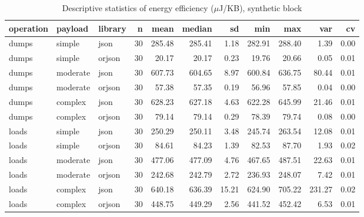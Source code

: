 \begin{table}[ht]
\centering
\begin{tabular}{lllrrrrrrrr}
  \toprule
operation & payload & library & n & mean & median & sd & min & max & var & cv \\ 
  \midrule
dumps & simple & json &  30 & 285.48 & 285.41 & 1.18 & 282.91 & 288.40 & 1.39 & 0.00 \\ 
  dumps & simple & orjson &  30 & 20.17 & 20.17 & 0.23 & 19.76 & 20.66 & 0.05 & 0.01 \\ 
  dumps & moderate & json &  30 & 607.73 & 604.65 & 8.97 & 600.84 & 636.75 & 80.44 & 0.01 \\ 
  dumps & moderate & orjson &  30 & 57.38 & 57.35 & 0.19 & 56.96 & 57.85 & 0.04 & 0.00 \\ 
  dumps & complex & json &  30 & 628.23 & 627.18 & 4.63 & 622.28 & 645.99 & 21.46 & 0.01 \\ 
  dumps & complex & orjson &  30 & 79.14 & 79.14 & 0.29 & 78.39 & 79.74 & 0.08 & 0.00 \\ 
  loads & simple & json &  30 & 250.29 & 250.11 & 3.48 & 245.74 & 263.54 & 12.08 & 0.01 \\ 
  loads & simple & orjson &  30 & 84.61 & 84.23 & 1.39 & 82.53 & 87.70 & 1.93 & 0.02 \\ 
  loads & moderate & json &  30 & 477.06 & 477.09 & 4.76 & 467.65 & 487.51 & 22.63 & 0.01 \\ 
  loads & moderate & orjson &  30 & 242.68 & 242.79 & 2.72 & 236.93 & 248.07 & 7.42 & 0.01 \\ 
  loads & complex & json &  30 & 640.18 & 636.39 & 15.21 & 624.90 & 705.22 & 231.27 & 0.02 \\ 
  loads & complex & orjson &  30 & 448.75 & 449.29 & 2.56 & 441.52 & 452.42 & 6.53 & 0.01 \\ 
   \bottomrule
\end{tabular}
\caption{Descriptive statistics of energy efficiency ($\mu$J/KB), synthetic block} 
\label{tab:desc_efficiency}
\end{table}
